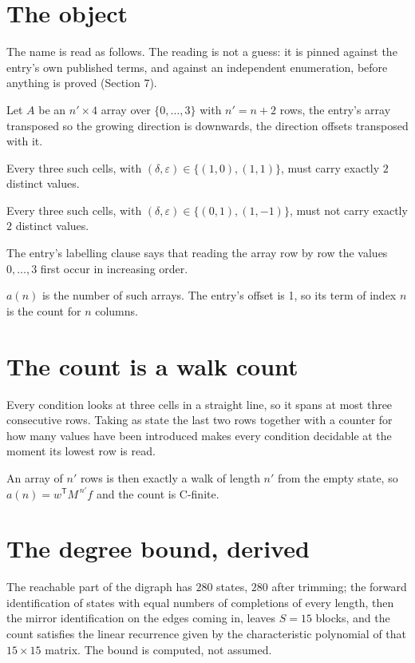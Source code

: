 \documentclass[11pt]{article}
\theoremstyle{definition}
\begin{document}
\section{The object}

The name is read as follows. The reading is not a guess: it is pinned against the entry's own published terms, and against an independent enumeration, before anything is proved (Section 7).

Let $A$ be an $n' \times 4$ array over $\{0,\dots,3\}$ with $n' = n + 2$ rows, the entry's array transposed so the growing direction is downwards, the direction offsets transposed with it.

Every three such cells, with $(\delta,\varepsilon) \in \{(1,0), (1,1)\}$, must carry exactly $2$ distinct values.

Every three such cells, with $(\delta,\varepsilon) \in \{(0,1), (1,-1)\}$, must not carry exactly $2$ distinct values.

The entry's labelling clause says that reading the array row by row the values $0,\dots,3$ first occur in increasing order.

$a(n)$ is the number of such arrays. The entry's offset is 1, so its term of index $n$ is the count for $n$ columns.

\section{The count is a walk count}

Every condition looks at three cells in a straight line, so it spans at most three consecutive rows. Taking as state the last two rows together with a counter for how many values have been introduced makes every condition decidable at the moment its lowest row is read.

An array of $n'$ rows is then exactly a walk of length $n'$ from the empty state, so $a(n) = w^{\mathsf T}M^{\,n'}f$ and the count is C-finite.

\section{The degree bound, derived}

The reachable part of the digraph has $280$ states, $280$ after trimming; the forward identification of states with equal numbers of completions of every length, then the mirror identification on the edges coming in, leaves $S = 15$ blocks, and the count satisfies the linear recurrence given by the characteristic polynomial of that $15\times15$ matrix. The bound is computed, not assumed.
\end{document}
